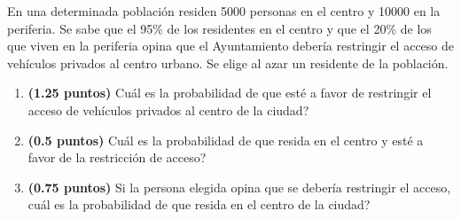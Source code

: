 
En una determinada población residen 5000 personas en el centro y 10000 en la periferia. Se sabe que el 95\% de los residentes en el centro y que el 20\% de los que viven en la periferia opina que el Ayuntamiento debería restringir el acceso de vehículos privados al centro urbano. Se elige al azar un residente de la población.
\begin{enumerate}[label=\alph*)]
\item \textbf{(1.25 puntos)} \textquestiondown{}Cuál es la probabilidad de que esté a favor de restringir el acceso de vehículos privados al centro de la ciudad?
\item \textbf{(0.5 puntos)} \textquestiondown{}Cuál es la probabilidad de que resida en el centro y esté a favor de la restricción de acceso?
\item \textbf{(0.75 puntos)} Si la persona elegida opina que se debería restringir el acceso, \textquestiondown{}cuál es la probabilidad de que resida en el centro de la ciudad?
\end{enumerate}
